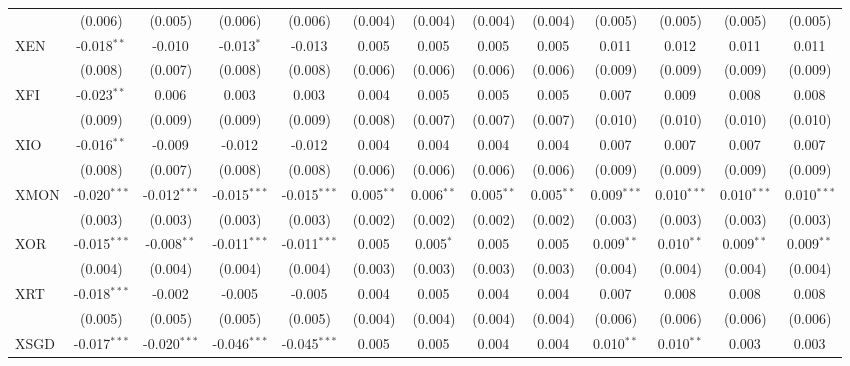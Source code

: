 \begin{table}[!htbp]
\begin{tabular}{@{\extracolsep{5pt}}lcccccccccccc}
  & (0.006) & (0.005) & (0.006) & (0.006) & (0.004) & (0.004) & (0.004) & (0.004) & (0.005) & (0.005) & (0.005) & (0.005) \\
 XEN & -0.018$^{**}$ & -0.010$^{}$ & -0.013$^{*}$ & -0.013$^{}$ & 0.005$^{}$ & 0.005$^{}$ & 0.005$^{}$ & 0.005$^{}$ & 0.011$^{}$ & 0.012$^{}$ & 0.011$^{}$ & 0.011$^{}$ \\
  & (0.008) & (0.007) & (0.008) & (0.008) & (0.006) & (0.006) & (0.006) & (0.006) & (0.009) & (0.009) & (0.009) & (0.009) \\
 XFI & -0.023$^{**}$ & 0.006$^{}$ & 0.003$^{}$ & 0.003$^{}$ & 0.004$^{}$ & 0.005$^{}$ & 0.005$^{}$ & 0.005$^{}$ & 0.007$^{}$ & 0.009$^{}$ & 0.008$^{}$ & 0.008$^{}$ \\
  & (0.009) & (0.009) & (0.009) & (0.009) & (0.008) & (0.007) & (0.007) & (0.007) & (0.010) & (0.010) & (0.010) & (0.010) \\
 XIO & -0.016$^{**}$ & -0.009$^{}$ & -0.012$^{}$ & -0.012$^{}$ & 0.004$^{}$ & 0.004$^{}$ & 0.004$^{}$ & 0.004$^{}$ & 0.007$^{}$ & 0.007$^{}$ & 0.007$^{}$ & 0.007$^{}$ \\
  & (0.008) & (0.007) & (0.008) & (0.008) & (0.006) & (0.006) & (0.006) & (0.006) & (0.009) & (0.009) & (0.009) & (0.009) \\
 XMON & -0.020$^{***}$ & -0.012$^{***}$ & -0.015$^{***}$ & -0.015$^{***}$ & 0.005$^{**}$ & 0.006$^{**}$ & 0.005$^{**}$ & 0.005$^{**}$ & 0.009$^{***}$ & 0.010$^{***}$ & 0.010$^{***}$ & 0.010$^{***}$ \\
  & (0.003) & (0.003) & (0.003) & (0.003) & (0.002) & (0.002) & (0.002) & (0.002) & (0.003) & (0.003) & (0.003) & (0.003) \\
 XOR & -0.015$^{***}$ & -0.008$^{**}$ & -0.011$^{***}$ & -0.011$^{***}$ & 0.005$^{}$ & 0.005$^{*}$ & 0.005$^{}$ & 0.005$^{}$ & 0.009$^{**}$ & 0.010$^{**}$ & 0.009$^{**}$ & 0.009$^{**}$ \\
  & (0.004) & (0.004) & (0.004) & (0.004) & (0.003) & (0.003) & (0.003) & (0.003) & (0.004) & (0.004) & (0.004) & (0.004) \\
 XRT & -0.018$^{***}$ & -0.002$^{}$ & -0.005$^{}$ & -0.005$^{}$ & 0.004$^{}$ & 0.005$^{}$ & 0.004$^{}$ & 0.004$^{}$ & 0.007$^{}$ & 0.008$^{}$ & 0.008$^{}$ & 0.008$^{}$ \\
  & (0.005) & (0.005) & (0.005) & (0.005) & (0.004) & (0.004) & (0.004) & (0.004) & (0.006) & (0.006) & (0.006) & (0.006) \\
 XSGD & -0.017$^{***}$ & -0.020$^{***}$ & -0.046$^{***}$ & -0.045$^{***}$ & 0.005$^{}$ & 0.005$^{}$ & 0.004$^{}$ & 0.004$^{}$ & 0.010$^{**}$ & 0.010$^{**}$ & 0.003$^{}$ & 0.003$^{}$ \\

\end{tabular}
\end{table}
